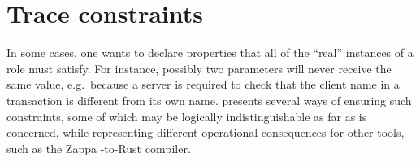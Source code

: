 
\chapter{Trace constraints}
\label{chap:trace:constraints}

In some cases, one wants to declare properties that all of the
``real'' instances of a role must satisfy.  For instance, possibly two
parameters will never receive the same value, e.g.~because a server is
required to check that the client name in a transaction is different
from its own name.  {\cpsa} presents several ways of ensuring such
constraints, some of which may be logically indistinguishable as far
as {\cpsa} is concerned, while representing different operational
consequences for other tools, such as the Zappa {\cpsa}-to-Rust
compiler.




